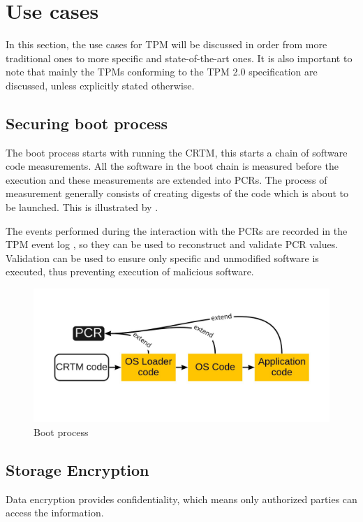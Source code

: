 \section{Use cases}
In this section, the use cases for TPM will be discussed in order from more traditional ones to more specific and state-of-the-art ones. It is also important to note that mainly the TPMs conforming to the TPM 2.0 specification are discussed, unless explicitly stated otherwise.

\subsection{Securing boot process}
The boot process starts with running the CRTM, this starts a chain of software code measurements. All the software in the boot chain is measured before the execution and these measurements are extended into PCRs. The process of measurement generally consists of creating digests of the code which is about to be launched. This is illustrated by . 

The events performed during the interaction with the PCRs are recorded in the TPM event log \cite{tcg_tpm2_pcspec}, so they can be used to reconstruct and validate PCR values. Validation can be used to ensure only specific and unmodified software is executed, thus preventing execution of malicious software.

\begin{figure}[H]
    \centering
    \includegraphics[width=\textwidth]{img/boot.jpg}
    \caption{Boot process}
    \label{fig:boot}
\end{figure}

\subsection{Storage Encryption}
Data encryption provides confidentiality, which means only authorized parties can access the information. 

